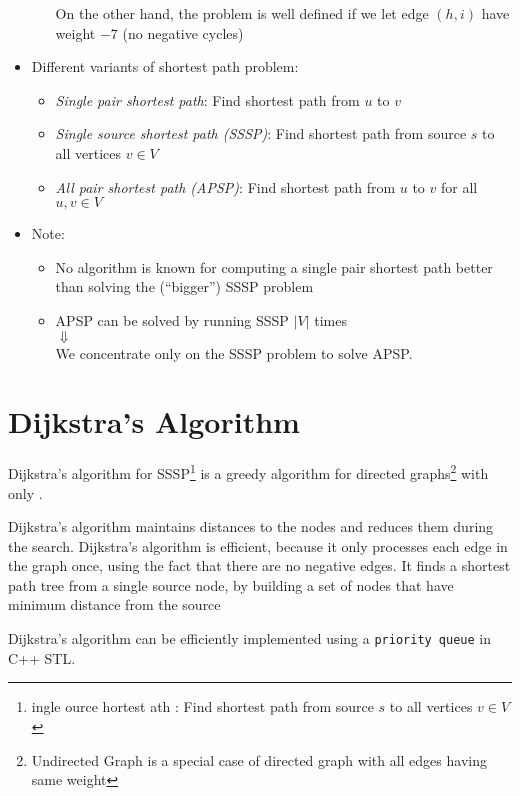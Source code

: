 \documentclass[twoside,12pt,a4paper,english]{book}
\theoremstyle{definition}
\theoremstyle{problemstyle}
\theoremstyle{problemstyle}
\theoremstyle{problemstyle}
\begin{document}
\begin{itemize}
\begin{itemize}
  On the other hand, the problem is well defined if we let edge
  $(h,i)$ have weight $-7$ (no negative cycles)
\end{itemize}
\item Different variants of shortest path problem:
  \begin{itemize}
  \item {\em Single pair shortest path}: Find shortest path from $u$
    to $v$
  \item {\em Single source shortest path (SSSP)}: Find shortest path
    from source $s$ to all vertices $v \in V$
  \item {\em All pair shortest path (APSP)}: Find shortest path from
    $u$ to $v$ for all $u,v \in V$
  \end{itemize}
\item Note:
  \begin{itemize}
  \item No algorithm is known for computing a single pair shortest path
    better than solving the (``bigger'') SSSP problem
  \item APSP can be solved by running SSSP $\vert V \vert$ times \\
    $\Downarrow$ \\
    We concentrate only on the SSSP problem to solve APSP.
  \end{itemize}
\end{itemize}

\chapter{Dijkstra’s Algorithm}

Dijkstra’s algorithm for SSSP\footnote{ingle ource hortest ath : Find shortest path from source $s$ to all vertices $v \in V$} is a greedy algorithm for directed graphs\footnote{Undirected Graph is a special case of directed graph with all edges having same weight} with only .

Dijkstra’s algorithm maintains distances
to the nodes and reduces them during the search. Dijkstra’s algorithm is efficient,
because it only processes each edge in the graph once, using the fact that there
are no negative edges. It finds a shortest path tree from a single source node, by building a set of nodes that have minimum distance from the source

Dijkstra's algorithm can be efficiently implemented using a \texttt{priority queue} in C++ STL.
\end{document}
